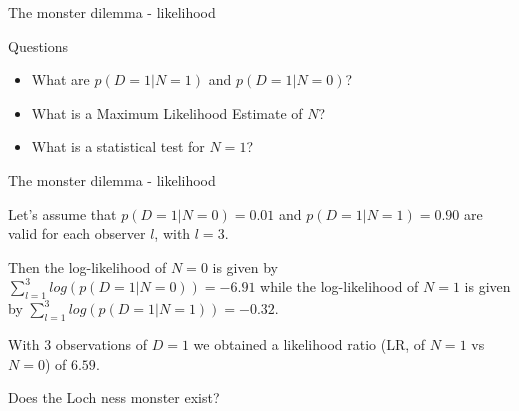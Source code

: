 
\begin{frame}{The monster dilemma - likelihood}

	\begin{block}{Questions}
		\begin{itemize}
			\item What are $p(D=1|N=1)$ and $p(D=1|N=0)$?
			\item What is a Maximum Likelihood Estimate of $N$?
			\item What is a statistical test for $N=1$?
		\end{itemize}
	\end{block}

\end{frame}

\begin{frame}{The monster dilemma - likelihood}

	Let's assume that $p(D=1|N=0)=0.01$ and $p(D=1|N=1)=0.90$ are valid for each observer $l$, with $l=3$.

	Then the log-likelihood of $N=0$ is given by $\sum_{l=1}^3 log(p(D=1|N=0))=-6.91$ while
	the log-likelihood of $N=1$ is given by $\sum_{l=1}^3 log(p(D=1|N=1))=-0.32$.

	With 3 observations of $D=1$ we obtained a likelihood ratio (LR, of $N=1$ vs $N=0$) of $6.59$.

	\begin{block}{}
		Does the Loch ness monster exist?
	\end{block}

\end{frame}

